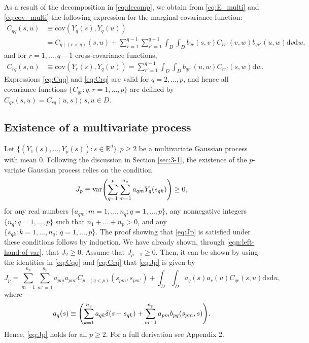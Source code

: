 \documentclass[lineno]{biometrika}
\newcommand{\intd} {\textrm{d}}
\newcommand{\svec} {s}
\newcommand{\uvec} {u}
\renewcommand{\v}{v}
\newcommand{\w}{w}
\newcommand{\bzero}{0}
\newcommand{\cov}{\mathrm{cov}}
\newcommand{\var}{\mathrm{var}}
\let\originalleft\left
\let\originalright\right
\renewcommand{\left}{\mathopen{}\mathclose\bgroup\originalleft}
\renewcommand{\right}{\aftergroup\egroup\originalright}
\begin{document}
As a result of the decomposition in \eqref{eq:decomp}, we obtain from \eqref{eq:E_multi} and \eqref{eq:cov_multi} the following expression for the marginal covariance function:
\begin{align}
C_{qq}(\svec,\uvec) &\equiv \cov(Y_q(\svec), Y_q(\uvec)) \nonumber \\
 & = C_{q \mid  (r<q)}(\svec,\uvec) + \sum_{r=1}^{q-1} \sum_{r'=1}^{q-1} \int_D\int_D b_{qr}(\svec,\v)C_{rr'}(\v,\w)b_{qr'}(\uvec,\w)\intd\v\intd\w, \label{eq:Cqq}
\end{align}
\noindent and for $r=1,\dots,q-1$ cross-covariance functions,
\begin{align}
C_{rq}(\svec,\uvec) &\equiv \cov(Y_r(\svec), Y_q(\uvec)) = \sum_{r'=1}^{q-1} \int_D\int_D b_{qr'}(\uvec,\w)C_{rr'}(\svec,\w)\intd\w. \label{eq:Crq}
\end{align}
Expressions \eqref{eq:Cqq} and \eqref{eq:Crq} are valid for $q=2,\dots,p$, and hence all covariance functions $\{C_{qr}:q,r=1,\dots,p\}$ are defined by $C_{qr}(\svec,\uvec) = C_{rq}(\uvec,\svec);~\svec,\uvec \in D$.

\subsection{Existence of a multivariate process}\label{sec:exist2}

Let $\{(Y_1(\svec),\dots,Y_p(\svec)): \svec \in \mathbb{R}^d\}, p \ge 2$ be a multivariate Gaussian process with mean $\bzero$. Following the discussion in Section \ref{sec:3-1}, the existence of the $p$-variate Gaussian process relies on the condition 
\begin{equation}\label{eq:Jp}
J_p \equiv \var\left(\sum_{q=1}^p \sum_{m=1}^{n_q} a_{qm}Y_q(\svec_{qk})\right) \ge 0,
\end{equation}
for any real numbers $\{a_{qm}: m = 1,\dots,n_q; q = 1,\dots,p\}$, any nonnegative integers $\{n_q: q=1,\dots,p\}$ such that $n_1 + \dots + n_p > 0$, and any $\{\svec_{qk} : k = 1,\dots,n_q;~q = 1,\dots, p\}$. The proof showing that \eqref{eq:Jp} is satisfied under these conditions follows by induction. We have already shown, through \eqref{eqn:left-hand-of-var}, that $J_2 \ge 0$. Assume that $J_{p-1} \ge 0$. Then, it can be shown by using the identities in \eqref{eq:Cqq} and \eqref{eq:Crq} that  \eqref{eq:Jp} is given by
\begin{equation*}
  J_p= \sum_{m=1}^{n_p}\sum_{m'=1}^{n_p}a_{pm}a_{pm'}C_{p \mid  (q < p)}(\svec_{pm},\svec_{pm'}) + \int_D\int_Da_q(\svec)a_r(\uvec)C_{qr}(\svec,\uvec)\intd \svec \intd \uvec,
\end{equation*}
\noindent where 
\begin{equation}\label{eq:a_def2}
a_q(\svec) \equiv \left(\sum_{k=1}^{n_q}a_{qk}\delta(\svec - \svec_{qk}) + \sum_{m=1}^{n_p}a_{pm}b_{pq}(\svec_{pm},\svec)\right).
\end{equation}
Hence, \eqref{eq:Jp} holds for all $p \ge 2$. For a full derivation see Appendix 2.
\end{document}
